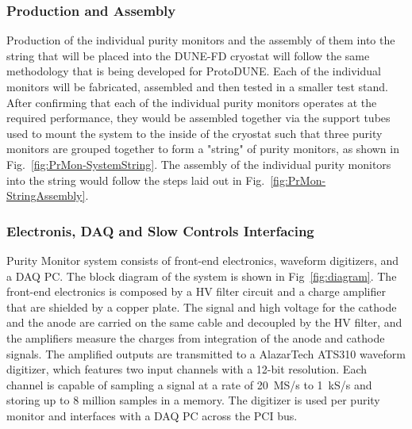 \subsubsection{Production and Assembly}
\label{sec:PrMon-Production-Assembly}
Production of the individual purity monitors and the assembly of them into the string that will be placed into the DUNE-FD cryostat will follow the same methodology that is being developed for ProtoDUNE.  Each of the individual monitors will be fabricated, assembled and then tested in a smaller test stand.  After confirming that each of the individual purity monitors operates at the required performance, they would be assembled together via the support tubes used to mount the system to the inside of the cryostat such that three purity monitors are grouped together to form a "string" of purity monitors, as shown in Fig.~\ref{fig:PrMon-SystemString}.  The assembly of the individual purity monitors into the string would follow the steps laid out in Fig.~\ref{fig:PrMon-StringAssembly}.  




\subsubsection{Electronis, DAQ and Slow Controls Interfacing}
Purity Monitor system consists of front-end electronics, waveform digitizers, and a DAQ PC. The block diagram of the system is shown in Fig~\ref{fig:diagram}. The front-end electronics is composed by a HV filter circuit and a charge amplifier that are shielded by a copper plate. The signal and high voltage for the cathode and the anode are carried on the same cable and decoupled by the HV filter, and the amplifiers measure the charges from integration of the anode and cathode signals. The amplified outputs are transmitted to a AlazarTech ATS310 waveform digitizer, which features two input channels with a 12-bit resolution. Each channel is capable of sampling a signal at a rate of 20~MS/s to 1~kS/s and storing up to 8 million samples in a memory. The digitizer is used per purity monitor and interfaces with a DAQ PC across the PCI bus.

